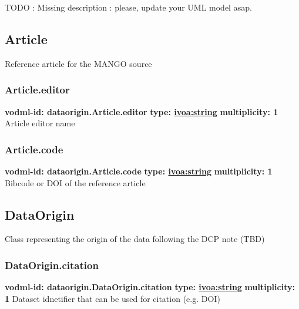 
  TODO : Missing description : please, update your UML model asap.

  \subsection{Article}
  \label{sect:dataorigin.Article}
    Reference article for the MANGO source

    \subsubsection{Article.editor}
      \textbf{vodml-id: dataorigin.Article.editor} \newline
      \textbf{type: \hyperref[sect:ivoa]{ivoa:string}} \newline
      \textbf{multiplicity: 1} \newline
      Article editor name

    \subsubsection{Article.code}
      \textbf{vodml-id: dataorigin.Article.code} \newline
      \textbf{type: \hyperref[sect:ivoa]{ivoa:string}} \newline
      \textbf{multiplicity: 1} \newline
      Bibcode or DOI of the reference article

  \subsection{DataOrigin}
  \label{sect:dataorigin.DataOrigin}
    Class representing the origin of the data following the DCP note (TBD)

    \subsubsection{DataOrigin.citation}
      \textbf{vodml-id: dataorigin.DataOrigin.citation} \newline
      \textbf{type: \hyperref[sect:ivoa]{ivoa:string}} \newline
      \textbf{multiplicity: 1} \newline
      Dataset idnetifier that can be used for citation (e.g. DOI)

